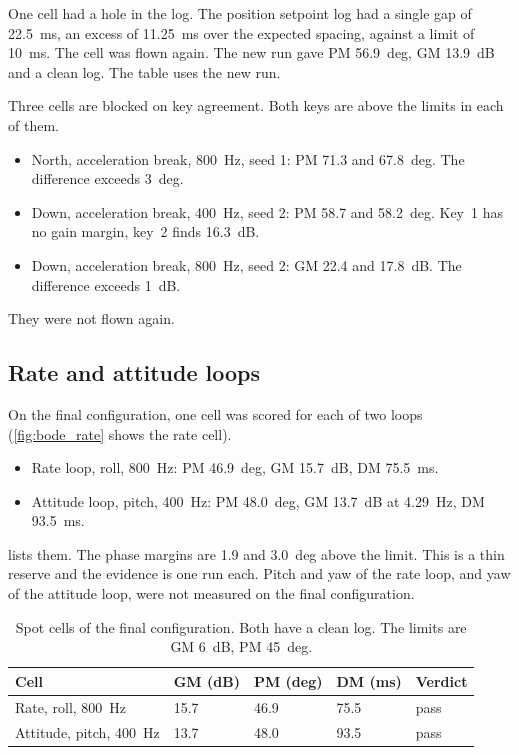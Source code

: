 One cell had a hole in the log.
The position setpoint log had a single gap of 22.5~ms, an excess of 11.25~ms over the expected spacing, against a limit of 10~ms.
The cell was flown again.
The new run gave PM 56.9~deg, GM 13.9~dB and a clean log.
The table uses the new run.

Three cells are blocked on key agreement.
Both keys are above the limits in each of them.
\begin{itemize}
  \item North, acceleration break, 800~Hz, seed 1: PM 71.3 and 67.8~deg. The difference exceeds 3~deg.
  \item Down, acceleration break, 400~Hz, seed 2: PM 58.7 and 58.2~deg. Key~1 has no gain margin, key~2 finds 16.3~dB.
  \item Down, acceleration break, 800~Hz, seed 2: GM 22.4 and 17.8~dB. The difference exceeds 1~dB.
\end{itemize}
They were not flown again.

\subsection{Rate and attitude loops}\label{sec:an_rate_att}

On the final configuration, one cell was scored for each of two loops (\cref{fig:bode_rate} shows the rate cell).
\begin{itemize}
  \item Rate loop, roll, 800~Hz: PM 46.9~deg, GM 15.7~dB, DM 75.5~ms.
  \item Attitude loop, pitch, 400~Hz: PM 48.0~deg, GM 13.7~dB at 4.29~Hz, DM 93.5~ms.
\end{itemize}
 lists them.
The phase margins are 1.9 and 3.0~deg above the limit.
This is a thin reserve and the evidence is one run each.
Pitch and yaw of the rate loop, and yaw of the attitude loop, were not measured on the final configuration.

\begin{table}[tbp]
\caption{Spot cells of the final configuration. Both have a clean log. The limits are GM 6~dB, PM 45~deg.}\label{tab:an_spot}
\centering
\small
\begin{tabularx}{\textwidth}{@{}L{4.2cm} L{1.7cm} L{1.7cm} L{1.7cm} Y@{}}
\toprule
Cell & GM (dB) & PM (deg) & DM (ms) & Verdict \\
\midrule
Rate, roll, 800~Hz & 15.7 & 46.9 & 75.5 & pass \\
Attitude, pitch, 400~Hz & 13.7 & 48.0 & 93.5 & pass \\
\bottomrule
\end{tabularx}
\end{table}

